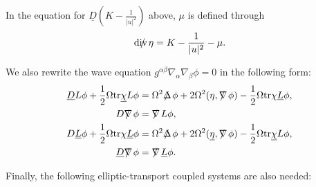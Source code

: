 \documentclass[11pt,reqno]{amsart}
\theoremstyle{definition}
\numberwithin{equation}{section}
\newcommand{\tr}{\mathrm{tr}}
\def\betab{\underline{\beta}}
\def\chib{\underline{\chi}}
\def\chibh{\widehat{\underline{\chi}}}
\def\chih{\widehat{\chi}}
\def\etab{\underline{\eta}}
\def\Lb{\underline{L}}
\def\tr{\mathrm{tr}}
\newcommand{\Db}{\underline{D}}
\def\nablas{\mbox{$\nabla \mkern -13mu /$ }}
\def\Deltas{\mbox{$\Delta \mkern -13mu /$ }}
\def\divs{\mbox{$\mathrm{div} \mkern -13mu /$ }}
\def\omegas{\mbox{$\omega \mkern -13mu /$ }}
\def\ds{\mbox{$\nabla \mkern -13mu /$ }}
\begin{document}
In the equation for $\Db (K-\frac{1}{|u|^2})$ above, $\mu$ is defined through
$$\divs\eta=K-\frac{1}{|u|^2}-\mu.$$


We also rewrite the wave equation $g^{\alpha\beta}\nabla_\alpha\nabla_\beta\phi=0$ in the following form:
\begin{align*}
\Db L\phi+\frac{1}{2}\Omega\tr\chib L\phi&=\Omega^2\Deltas\phi+2\Omega^2(\eta,\ds\phi)-\frac{1}{2}\Omega\tr\chi\Lb\phi,\\
D\ds\phi&=\nablas L\phi,\\
D\Lb\phi+\frac{1}{2}\Omega\tr\chi\Lb\phi&=\Omega^2\Deltas\phi+2\Omega^2(\etab,\ds\phi)-\frac{1}{2}\Omega\tr\chib L\phi,\\
\Db\ds\phi&=\nablas\Lb\phi.
\end{align*}


Finally, the following elliptic-transport coupled systems are also needed:

\end{document}

